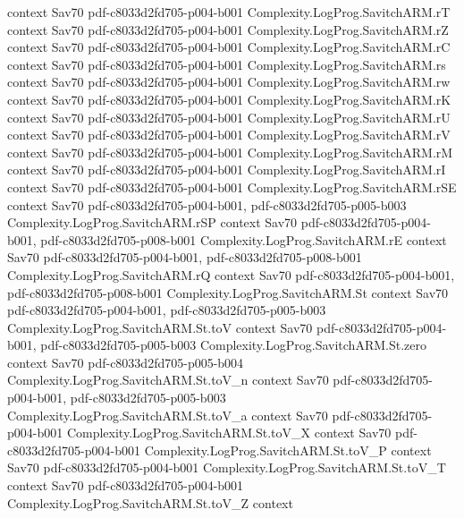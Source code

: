 \begin{theorem}
  {context}
  {Sav70}
  {pdf-c8033d2fd705-p004-b001}
\proofstep
  {Complexity.LogProg.SavitchARM.rT}
  {context}
  {Sav70}
  {pdf-c8033d2fd705-p004-b001}
\proofstep
  {Complexity.LogProg.SavitchARM.rZ}
  {context}
  {Sav70}
  {pdf-c8033d2fd705-p004-b001}
\proofstep
  {Complexity.LogProg.SavitchARM.rC}
  {context}
  {Sav70}
  {pdf-c8033d2fd705-p004-b001}
\proofstep
  {Complexity.LogProg.SavitchARM.rs}
  {context}
  {Sav70}
  {pdf-c8033d2fd705-p004-b001}
\proofstep
  {Complexity.LogProg.SavitchARM.rw}
  {context}
  {Sav70}
  {pdf-c8033d2fd705-p004-b001}
\proofstep
  {Complexity.LogProg.SavitchARM.rK}
  {context}
  {Sav70}
  {pdf-c8033d2fd705-p004-b001}
\proofstep
  {Complexity.LogProg.SavitchARM.rU}
  {context}
  {Sav70}
  {pdf-c8033d2fd705-p004-b001}
\proofstep
  {Complexity.LogProg.SavitchARM.rV}
  {context}
  {Sav70}
  {pdf-c8033d2fd705-p004-b001}
\proofstep
  {Complexity.LogProg.SavitchARM.rM}
  {context}
  {Sav70}
  {pdf-c8033d2fd705-p004-b001}
\proofstep
  {Complexity.LogProg.SavitchARM.rI}
  {context}
  {Sav70}
  {pdf-c8033d2fd705-p004-b001}
\proofstep
  {Complexity.LogProg.SavitchARM.rSE}
  {context}
  {Sav70}
  {pdf-c8033d2fd705-p004-b001,
    pdf-c8033d2fd705-p005-b003}
\proofstep
  {Complexity.LogProg.SavitchARM.rSP}
  {context}
  {Sav70}
  {pdf-c8033d2fd705-p004-b001,
    pdf-c8033d2fd705-p008-b001}
\proofstep
  {Complexity.LogProg.SavitchARM.rE}
  {context}
  {Sav70}
  {pdf-c8033d2fd705-p004-b001,
    pdf-c8033d2fd705-p008-b001}
\proofstep
  {Complexity.LogProg.SavitchARM.rQ}
  {context}
  {Sav70}
  {pdf-c8033d2fd705-p004-b001,
    pdf-c8033d2fd705-p008-b001}
\proofstep
  {Complexity.LogProg.SavitchARM.St}
  {context}
  {Sav70}
  {pdf-c8033d2fd705-p004-b001,
    pdf-c8033d2fd705-p005-b003}
\proofstep
  {Complexity.LogProg.SavitchARM.St.toV}
  {context}
  {Sav70}
  {pdf-c8033d2fd705-p004-b001,
    pdf-c8033d2fd705-p005-b003}
\proofstep
  {Complexity.LogProg.SavitchARM.St.zero}
  {context}
  {Sav70}
  {pdf-c8033d2fd705-p005-b004}
\proofstep
  {Complexity.LogProg.SavitchARM.St.toV_n}
  {context}
  {Sav70}
  {pdf-c8033d2fd705-p004-b001,
    pdf-c8033d2fd705-p005-b003}
\proofstep
  {Complexity.LogProg.SavitchARM.St.toV_a}
  {context}
  {Sav70}
  {pdf-c8033d2fd705-p004-b001}
\proofstep
  {Complexity.LogProg.SavitchARM.St.toV_X}
  {context}
  {Sav70}
  {pdf-c8033d2fd705-p004-b001}
\proofstep
  {Complexity.LogProg.SavitchARM.St.toV_P}
  {context}
  {Sav70}
  {pdf-c8033d2fd705-p004-b001}
\proofstep
  {Complexity.LogProg.SavitchARM.St.toV_T}
  {context}
  {Sav70}
  {pdf-c8033d2fd705-p004-b001}
\proofstep
  {Complexity.LogProg.SavitchARM.St.toV_Z}
  {context}

\end{theorem}
